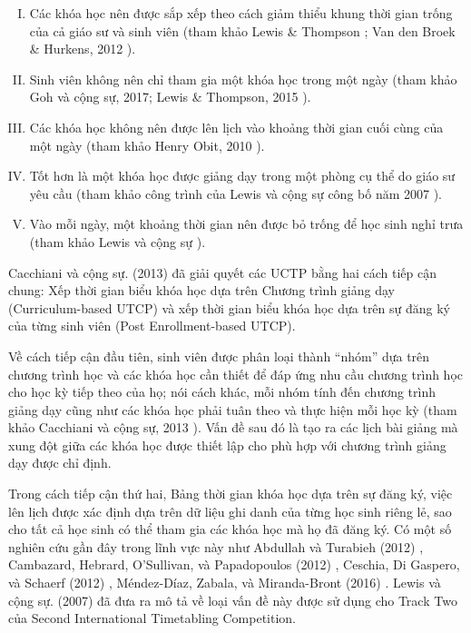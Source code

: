 \documentclass[11pt]{article}
\begin{document}
\begin{enumerate}[I.]
\item Các khóa học nên được sắp xếp theo cách giảm thiểu khung thời gian trống của cả giáo sư và sinh viên (tham khảo Lewis \& Thompson \cite{Lewis:Thompson:2015}; Van den Broek \& Hurkens, 2012 \cite{VandenBroek:Hurkens:2012}).

\item Sinh viên không nên chỉ tham gia một khóa học trong một ngày (tham khảo Goh và cộng sự, 2017; Lewis \& Thompson, 2015 \cite{Lewis:Thompson:2015}).

\item Các khóa học không nên được lên lịch vào khoảng thời gian cuối cùng của một ngày (tham khảo Henry Obit, 2010 \cite{HenryObit:2010}).

\item Tốt hơn là một khóa học được giảng dạy trong một phòng cụ thể do giáo sư yêu cầu (tham khảo công trình của Lewis và cộng sự công bố năm 2007 \cite{Lewis:al:2007}).

\item Vào mỗi ngày, một khoảng thời gian nên được bỏ trống để học sinh nghỉ trưa (tham khảo Lewis và cộng sự  \cite{Lewis:al:2007}).
\end{enumerate}

Cacchiani và cộng sự. (2013) \cite{Cacchiani:al:2013} đã giải quyết các UCTP bằng hai cách tiếp cận chung: Xếp thời gian biểu khóa học dựa trên Chương trình giảng dạy (Curriculum-based UTCP) và xếp thời gian biểu khóa học dựa trên sự đăng ký của từng sinh viên (Post Enrollment-based UTCP).

Về cách tiếp cận đầu tiên, sinh viên được phân loại thành “nhóm” dựa trên chương trình học và các khóa học cần thiết để đáp ứng nhu cầu chương trình học cho học kỳ tiếp theo của họ; nói cách khác, mỗi nhóm tính đến chương trình giảng dạy cũng như các khóa học phải tuân theo và thực hiện mỗi học kỳ (tham khảo Cacchiani và cộng sự, 2013 \cite{Cacchiani:al:2013}). Vấn đề sau đó là tạo ra các lịch bài giảng mà xung đột giữa các khóa học được thiết lập cho phù hợp với chương trình giảng dạy được chỉ định.

Trong cách tiếp cận thứ hai, Bảng thời gian khóa học dựa trên sự đăng ký, việc lên lịch được xác định dựa trên dữ liệu ghi danh của từng học sinh riêng lẻ, sao cho tất cả học sinh có thể tham gia các khóa học mà họ đã đăng ký. Có một số nghiên cứu gần đây trong lĩnh vực này như Abdullah và Turabieh (2012) \cite{Abdullah:Turabieh:2012}, Cambazard, Hebrard, O'Sullivan, và Papadopoulos (2012) \cite{Cambazard:al:2012}, Ceschia, Di Gaspero, và Schaerf (2012) \cite{Ceschia:al:2012}, Méndez-Díaz, Zabala, và Miranda-Bront (2016) \cite{Mendez-Diaz:al:2016}. Lewis và cộng sự. (2007) \cite{Lewis:al:2007} đã đưa ra mô tả về loại vấn đề này được sử dụng cho Track Two của Second International Timetabling Competition.
\end{document}
